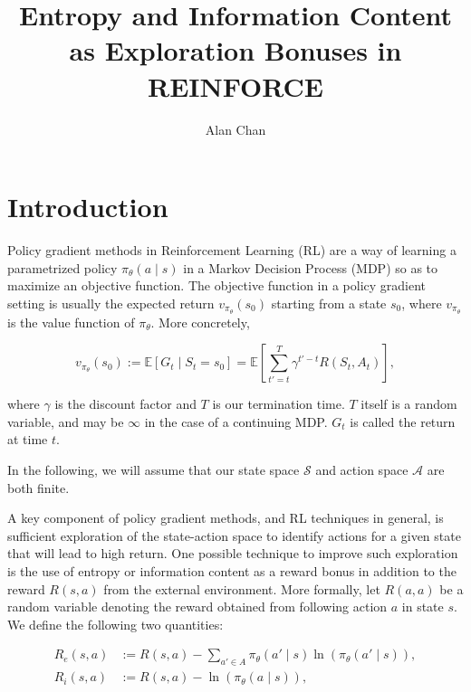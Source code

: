\documentclass{article}
\title{Entropy and Information Content as Exploration Bonuses in REINFORCE}
\author{Alan Chan}
\date{}
\newcommand{\Ex}{\mathbb{E}}
\begin{document}
  \maketitle

  \begin{abstract}

  \end{abstract}

  \section{Introduction}
  Policy gradient methods \citep[Chapter~13]{sutton2018reinforcement} in Reinforcement Learning (RL) are a way of learning a parametrized policy $\pi_\theta(a \mid s)$ in a Markov Decision Process (MDP) \citep[Chapter~3]{sutton2018reinforcement} so as to maximize an objective function. The objective function in a policy gradient setting is usually the expected return $v_{\pi_\theta}(s_0)$ starting from a state $s_0$, where $v_{\pi_\theta}$ is the value function of $\pi_\theta$. More concretely,

  \begin{equation*}
    v_{\pi_\theta}(s_0) := \Ex\left[G_t \mid S_t = s_0\right] = \Ex\left[\sum_{t' = t}^T \gamma^{t'- t} R(S_t, A_t) \right],
  \end{equation*}

  where $\gamma$ is the discount factor and $T$ is our termination time. $T$ itself is a random variable, and may be $\infty$ in the case of a continuing MDP. $G_t$ is called the return at time $t$.

  In the following, we will assume that our state space $\mathcal{S}$ and action space $\mathcal{A}$ are both finite.

  A key component of policy gradient methods, and RL techniques in general, is sufficient exploration of the state-action space to identify actions for a given state that will lead to high return. One possible technique to improve such exploration is the use of entropy or information content as a reward bonus in addition to the reward $R(s, a)$ from the external environment. More formally, let $R(a, a)$ be a random variable denoting the reward obtained from following action $a$ in state $s$. We define the following two quantities:

  \begin{align*}
    R_e(s, a) &:= R(s, a) - \sum_{a' \in A} \pi_\theta(a' \mid s) \ln\left(\pi_\theta(a' \mid s)\right),\\
    R_i(s, a) &:= R(s, a) - \ln\left(\pi_\theta(a \mid s)\right),
  \end{align*}
\end{document}
